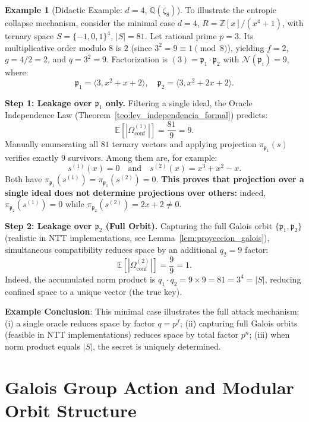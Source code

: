 \documentclass[11pt,a4paper]{article}
\theoremstyle{plain}
\theoremstyle{definition}
\newtheorem{ejemplo}[teorema]{Example}
\numberwithin{equation}{section}
\newcommand{\QQ}{\mathbb{Q}}
\newcommand{\ZZ}{\mathbb{Z}}
\newcommand{\cN}{\mathcal{N}}
\newcommand{\fkp}{\mathfrak{p}}
\newcommand{\E}{\mathbb{E}}
\begin{document}
\begin{ejemplo}[Didactic Example: $d=4$, $\QQ(\zeta_8)$]
\label{ej:ejemplo_d4}
To illustrate the entropic collapse mechanism, consider the minimal case $d = 4$, $R = \ZZ[x]/(x^4+1)$, with ternary space $S = \{-1,0,1\}^4$, $|S| = 81$. Let rational prime $p = 3$. Its multiplicative order modulo $8$ is $2$ (since $3^2 = 9 \equiv 1 \pmod 8$), yielding $f = 2$, $g = 4/2 = 2$, and $q = 3^2 = 9$. Factorization is $(3) = \fkp_1 \cdot \fkp_2$ with $\cN(\fkp_i) = 9$, where:
\[
\fkp_1 = \langle 3, x^2 + x + 2 \rangle, \quad \fkp_2 = \langle 3, x^2 + 2x + 2 \rangle.
\]

\textbf{Step 1: Leakage over $\fkp_1$ only.} Filtering a single ideal, the Oracle Independence Law (Theorem~\ref{teo:ley_independencia_formal}) predicts:
\[
\E[|\Omega_{\text{conf}}^{(1)}|] = \frac{81}{9} = 9.
\]
Manually enumerating all $81$ ternary vectors and applying projection $\pi_{\fkp_1}(s)$ verifies exactly $9$ survivors. Among them are, for example:
\[
s^{(1)}(x) = 0 \quad \text{and} \quad s^{(2)}(x) = x^3 + x^2 - x.
\]
Both have $\pi_{\fkp_1}(s^{(1)}) = \pi_{\fkp_1}(s^{(2)}) = 0$. \textbf{This proves that projection over a single ideal does not determine projections over others:} indeed, $\pi_{\fkp_2}(s^{(1)}) = 0$ while $\pi_{\fkp_2}(s^{(2)}) = 2x + 2 \neq 0$.

\textbf{Step 2: Leakage over $\fkp_2$ (Full Orbit).} Capturing the full Galois orbit $\{\fkp_1, \fkp_2\}$ (realistic in NTT implementations, see Lemma~\ref{lem:proyeccion_galois}), simultaneous compatibility reduces space by an additional $q_2 = 9$ factor:
\[
\E[|\Omega_{\text{conf}}^{(2)}|] = \frac{9}{9} = 1.
\]
Indeed, the accumulated norm product is $q_1 \cdot q_2 = 9 \times 9 = 81 = 3^4 = |S|$, reducing confined space to a unique vector (the true key).

\textbf{Example Conclusion}: This minimal case illustrates the full attack mechanism: (i) a single oracle reduces space by factor $q = p^f$; (ii) capturing full Galois orbits (feasible in NTT implementations) reduces space by total factor $p^n$; (iii) when norm product equals $|S|$, the secret is uniquely determined.
\end{ejemplo}

\section{Galois Group Action and Modular Orbit Structure}
\label{sec:galois_invariants}
\end{document}
